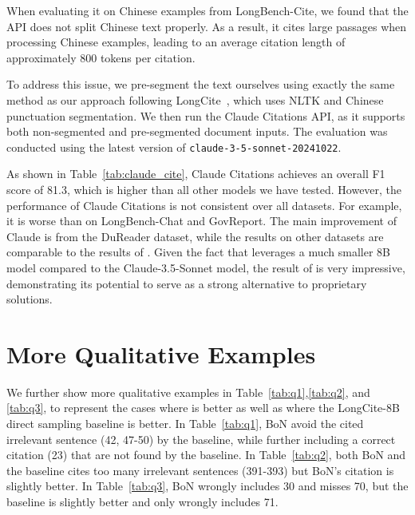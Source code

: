When evaluating it on Chinese examples from LongBench-Cite, we found that the API does not split Chinese text properly. As a result, it cites large passages when processing Chinese examples, leading to an average citation length of approximately 800 tokens per citation.

To address this issue, we pre-segment the text ourselves using exactly the same method as our approach following LongCite~\citep{zhang2024longcite}, which uses NLTK and Chinese punctuation segmentation. We then run the Claude Citations API, as it supports both non-segmented and pre-segmented document inputs. The evaluation was conducted using the latest version of \texttt{claude-3-5-sonnet-20241022}.

As shown in Table~\ref{tab:claude_cite}, Claude Citations achieves an overall F1 score of 81.3, which is higher than all other models we have tested.
However, the performance of Claude Citations is not consistent over all datasets. For example, it is worse than \ours on LongBench-Chat and GovReport. The main improvement of Claude is from the DuReader dataset, while the results on other datasets are comparable to the results of \ours. Given the fact that \ours leverages a much smaller 8B model compared to the Claude-3.5-Sonnet model, the result of \ours is very impressive, demonstrating its potential to serve as a strong alternative to proprietary solutions.



\section{More Qualitative Examples}
\label{appx:qual}

We further show more qualitative examples in Table~\ref{tab:q1},\ref{tab:q2}, and \ref{tab:q3}, to represent the cases where \ours is better as well as where the LongCite-8B direct sampling baseline is better. In Table~\ref{tab:q1}, \ours BoN avoid the cited irrelevant sentence (42, 47-50) by the baseline, while further including a correct citation (23) that are not found by the baseline. In Table~\ref{tab:q2}, both \ours BoN and the baseline cites too many irrelevant sentences (391-393) but \ours BoN's citation is slightly better. In Table~\ref{tab:q3}, \ours BoN wrongly includes 30 and misses 70, but the baseline is slightly better and only wrongly includes 71.





